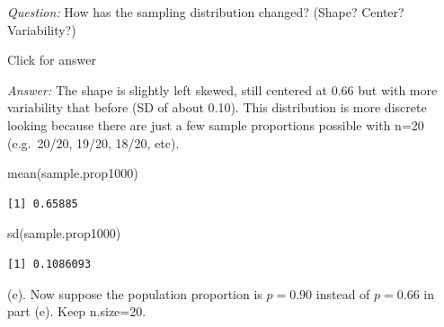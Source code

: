 \documentclass[
]{book}
\newenvironment{Shaded}{\begin{snugshade}}{\end{snugshade}}
\newcommand{\FunctionTok}[1]{\textcolor[rgb]{0.00,0.00,0.00}{#1}}
\newcommand{\NormalTok}[1]{#1}
\begin{document}
\emph{Question:} How has the sampling distribution changed? (Shape? Center? Variability?)

Click for answer

\emph{Answer:} The shape is slightly left skewed, still centered at 0.66 but with more variability that before (SD of about 0.10). This distribution is more discrete looking because there are just a few sample proportions possible with n=20 (e.g.~20/20, 19/20, 18/20, etc).

\begin{Shaded}
\begin{Highlighting}[]
\FunctionTok{mean}\NormalTok{(sample.prop1000)}
\end{Highlighting}
\end{Shaded}

\begin{verbatim}
[1] 0.65885
\end{verbatim}

\begin{Shaded}
\begin{Highlighting}[]
\FunctionTok{sd}\NormalTok{(sample.prop1000)}
\end{Highlighting}
\end{Shaded}

\begin{verbatim}
[1] 0.1086093
\end{verbatim}

(e). Now suppose the population proportion is \(p=0.90\) instead of \(p=0.66\) in part (e). Keep n.size=20.
\end{document}
